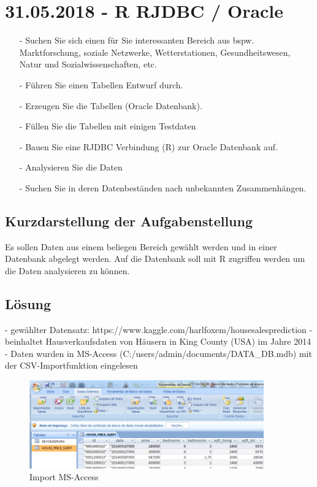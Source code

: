 \section{31.05.2018 - R RJDBC / Oracle}
\begin{itemize}
\item[-] Suchen Sie sich einen für Sie interessanten Bereich aus bspw. Marktforschung, soziale Netzwerke, Wetterstationen, Gesundheitswesen, Natur und Sozialwissenschaften, etc.
\item[-] Führen Sie einen Tabellen Entwurf durch.
\item[-] Erzeugen Sie die Tabellen (Oracle Datenbank).
\item[-] Füllen Sie die Tabellen mit einigen Testdaten
\item[-] Bauen Sie eine RJDBC Verbindung (R) zur Oracle Datenbank auf.
\item[-] Analysieren Sie die Daten
\item[-] Suchen Sie in deren Datenbeständen nach unbekannten Zusammenhängen.
\end{itemize}
\subsection*{Kurzdarstellung der Aufgabenstellung}
Es sollen Daten aus einem beliegen Bereich gewählt werden und in einer Datenbank abgelegt werden. Auf die Datenbank soll mit R zugriffen werden um die Daten analysieren zu können.
\subsection*{Lösung}
- gewählter Datensatz: https://www.kaggle.com/harlfoxem/housesalesprediction
- beinhaltet Hausverkaufsdaten von Häusern in King County (USA) im Jahre 2014
- Daten wurden in MS-Access (C:/users/admin/documents/DATA\_DB.mdb) mit der CSV-Importfunktion eingelesen

\begin{figure}[!htb]
        \begin{minipage}{1\textwidth}
                \centering
                \includegraphics[width=0.90\textwidth]{pics/rjdbc1.png}\par\vspace{0cm}
                \caption{Import MS-Access}
                \label{fig:rjdbc1}
        \end{minipage}
\end{figure}

